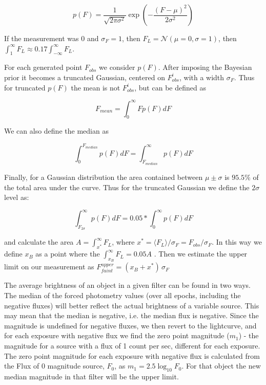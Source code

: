 \documentclass[fleqn,usenatbib]{mnras}  %
\begin{document}
\begin{equation}
p(F) = \frac{1}{\sqrt{2  \pi \sigma^{2}}} \exp{ \left(-\frac{(F-\mu)^{2}}{2\sigma^{2}}\right)}
\end{equation}

 If the measurement was $0$ and $\sigma_{F} = 1$, then  $F_{L} = \mathcal{N}(\mu=0,\sigma=1)$, then  $\int_{1} ^{\infty} {F_{L}} \approx 0.17  \int_{-\infty}^{\infty}{F_{L}} $.     

 For each generated point $F_{obs}$  we consider $p(F)$.  After imposing the Bayesian prior it becomes a truncated Gaussian, centered on $F_{obs}^{i}$, with a width $\sigma_F$. Thus for truncated $p(F)$  the mean is not $F_{obs}^{i}$, but can be defined as 

\begin{equation}
F_{mean} = \int _{0} ^ {\infty} {F p(F) dF}
\end{equation} 

We can also define the median as  

\begin{equation}
\int _{0} ^ {F_{median}} {p(F) dF} = \int _{F_{median}} ^ {\infty} {p(F) dF}
\end{equation} 

Finally, for a Gaussian distribution the area contained between $\mu \pm \sigma$ is $95.5 \%$ of the total area under the curve. Thus for the truncated Gaussian we define the  $2 \sigma$ level as: 

\begin{equation}
\int _{F_{2 \sigma}} ^{\infty} {p(F)dF} = 0.05 * \int _{0} ^{\infty} {p(F) dF}
\end{equation}


and calculate the area $A = \int_{x^{*}}^{\infty} {F_{L}}$, where   $x^{*} = \langle F_{L} \rangle / \sigma_{F} =  F_{obs} / \sigma_{F}$. In this way we define $x_{B}$ as a  point where the $ \int_{x_{B}} ^{\infty} {F_{L}}= 0.05 A$  . Then  we estimate the upper limit on our measurement  as  $F_{faint} ^ {upper} = (x_{B} + x^{*}) \, \sigma_{F}$




The average brightness of an object in  a given filter can be found in two ways. The median of the forced photometry values (over all epochs, including the negative fluxes)   will better reflect the actual brightness of a variable source. This may mean that the median is negative, i.e. the median flux is negative. Since the magnitude is undefined for negative fluxes, we then revert to the lightcurve, and for each exposure with negative flux we find the zero point magnitude ($m_1$) - the magnitude for a source with a flux of 1 count per sec, different for each exposure.  The zero point magnitude for each exposure with negative flux is calculated from the  Flux of 0 magnitude source,  $F_0$,  as  $m_{1} = 2.5 \log_{10}{F_{0}}$. For that object the new median magnitude in that filter will be the upper limit. 
\end{document}
